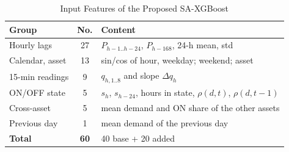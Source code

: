 \begin{table}[!t]
\caption{Input Features of the Proposed SA-XGBoost}
\label{tab:features}
\centering
\footnotesize
\setlength{\tabcolsep}{2.4pt}
\begin{tabular}{lcl}
\toprule
\textbf{Group} & \textbf{No.} & \textbf{Content} \\
\midrule
Hourly lags & 27 & $P_{h-1..h-24}$, $P_{h-168}$, 24-h mean, std \\
Calendar, asset & 13 & sin/cos of hour, weekday; weekend; asset \\
\midrule
15-min readings & 9 & $q_{h,1..8}$ and slope $\Delta q_h$ \\
ON/OFF state & 5 & $s_h$, $s_{h-24}$, hours in state, $\rho(d,t)$, $\rho(d,t{-}1)$ \\
Cross-asset & 5 & mean demand and ON share of the other assets \\
Previous day & 1 & mean demand of the previous day \\
\midrule
\textbf{Total} & \textbf{60} & 40 base + 20 added \\
\bottomrule
\end{tabular}
\end{table}
